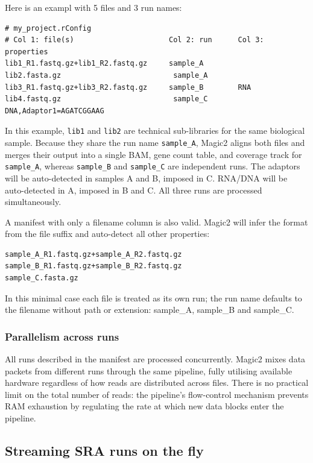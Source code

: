\documentclass[11pt]{article}
\newcommand{\code}[1]{\texttt{#1}}
\begin{document}
Here is an exampl with 5 files and 3 run names:

\begin{lstlisting}
# my_project.rConfig
# Col 1: file(s)                      Col 2: run      Col 3: properties
lib1_R1.fastq.gz+lib1_R2.fastq.gz     sample_A        
lib2.fasta.gz                          sample_A       
lib3_R1.fastq.gz+lib3_R2.fastq.gz     sample_B        RNA
lib4.fastq.gz                          sample_C       DNA,Adaptor1=AGATCGGAAG
\end{lstlisting}

In this example, \code{lib1} and \code{lib2} are technical sub-libraries
for the same biological sample.  Because they share the run name
\code{sample\_A}, Magic2 aligns both files and merges their output into
a single BAM, gene count table, and coverage track for \code{sample\_A},
whereas \code{sample\_B} and \code{sample\_C} are independent runs.
The adaptors will be auto-detected in samples A and B, imposed in C.
RNA/DNA will be auto-detected in A, imposed in B and C. 
All three runs are processed simultaneously.


A manifest with only a filename column is also valid.  Magic2 will infer the
format from the file suffix and auto-detect all other properties:

\begin{lstlisting}
sample_A_R1.fastq.gz+sample_A_R2.fastq.gz
sample_B_R1.fastq.gz+sample_B_R2.fastq.gz
sample_C.fasta.gz
\end{lstlisting}

In this minimal case each file is treated as its own run; the run name
defaults to the filename without path or extension: sample\_A, sample\_B and sample\_C.

\subsubsection{Parallelism across runs}

All runs described in the manifest are processed concurrently.
Magic2 mixes data packets from different runs through the same pipeline,
fully utilising available hardware regardless of how reads are distributed
across files.  There is no practical limit on the total number of reads:
the pipeline's flow-control mechanism prevents RAM exhaustion by
regulating the rate at which new data blocks enter the pipeline.

\subsection{Streaming SRA runs on the fly}
\end{document}
